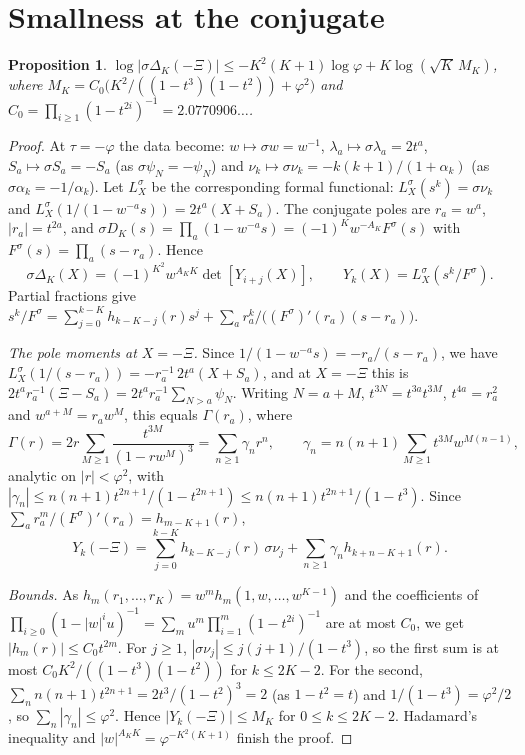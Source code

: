 \documentclass[11pt]{amsart}
\newtheorem{proposition}[theorem]{Proposition}
\theoremstyle{definition}
\theoremstyle{remark}
\numberwithin{equation}{section}
\begin{document}
\section{Smallness at the conjugate}\label{sec:conj}

\begin{proposition}\label{prop:conj}
$\log|\sigma\Delta_K(-\Xi)|\le-K^2(K+1)\log\varphi+K\log(\sqrt K\,M_K)$, where
$M_K=C_0\bigl(K^2/((1-t^3)(1-t^2))+\varphi^2\bigr)$ and $C_0=\prod_{i\ge1}(1-t^{2i})^{-1}=2.0770906\ldots$.
\end{proposition}
\begin{proof}
At $\tau=-\varphi$ the data become: $w\mapsto\sigma w=w^{-1}$, $\lambda_a\mapsto\sigma\lambda_a=2t^a$,
$S_a\mapsto\sigma S_a=-S_a$ (as $\sigma\psi_N=-\psi_N$) and $\nu_k\mapsto\sigma\nu_k=-k(k+1)/(1+\alpha_k)$ (as
$\sigma\alpha_k=-1/\alpha_k$). Let $L^\sigma_X$ be the corresponding formal functional:
$L^\sigma_X(s^k)=\sigma\nu_k$ and $L^\sigma_X(1/(1-w^{-a}s))=2t^a(X+S_a)$. The conjugate poles are $r_a=w^a$,
$|r_a|=t^{2a}$, and $\sigma D_K(s)=\prod_a(1-w^{-a}s)=(-1)^Kw^{-A_K}F^\sigma(s)$ with $F^\sigma(s)=\prod_a(s-r_a)$. Hence
\[
\sigma\Delta_K(X)=(-1)^{K^2}w^{A_KK}\det[Y_{i+j}(X)],\qquad Y_k(X)=L^\sigma_X(s^k/F^\sigma).
\]
Partial fractions give
$s^k/F^\sigma=\sum_{j=0}^{k-K}h_{k-K-j}(r)s^j+\sum_ar_a^k/\bigl((F^\sigma)'(r_a)(s-r_a)\bigr)$.

\emph{The pole moments at $X=-\Xi$.} Since $1/(1-w^{-a}s)=-r_a/(s-r_a)$, we have
$L^\sigma_X(1/(s-r_a))=-r_a^{-1}\,2t^a(X+S_a)$, and at $X=-\Xi$ this is
$2t^ar_a^{-1}(\Xi-S_a)=2t^ar_a^{-1}\sum_{N>a}\psi_N$. Writing $N=a+M$, $t^{3N}=t^{3a}t^{3M}$, $t^{4a}=r_a^2$ and
$w^{a+M}=r_aw^M$, this equals $\Gamma(r_a)$, where
\[
\Gamma(r)=2r\sum_{M\ge1}\frac{t^{3M}}{(1-rw^M)^3}=\sum_{n\ge1}\gamma_nr^n,\qquad
\gamma_n=n(n+1)\sum_{M\ge1}t^{3M}w^{M(n-1)},
\]
analytic on $|r|<\varphi^2$, with $|\gamma_n|\le n(n+1)t^{2n+1}/(1-t^{2n+1})\le n(n+1)t^{2n+1}/(1-t^3)$. Since
$\sum_ar_a^m/(F^\sigma)'(r_a)=h_{m-K+1}(r)$,
\[
Y_k(-\Xi)=\sum_{j=0}^{k-K}h_{k-K-j}(r)\,\sigma\nu_j+\sum_{n\ge1}\gamma_nh_{k+n-K+1}(r).
\]

\emph{Bounds.} As $h_m(r_1,\dots,r_K)=w^mh_m(1,w,\dots,w^{K-1})$ and the coefficients of
$\prod_{i\ge0}(1-|w|^iu)^{-1}=\sum_m u^m\prod_{i=1}^m(1-t^{2i})^{-1}$ are at most $C_0$, we get $|h_m(r)|\le C_0t^{2m}$.
For $j\ge1$, $|\sigma\nu_j|\le j(j+1)/(1-t^3)$, so the first sum is at most $C_0K^2/((1-t^3)(1-t^2))$ for $k\le2K-2$.
For the second, $\sum_nn(n+1)t^{2n+1}=2t^3/(1-t^2)^3=2$ (as $1-t^2=t$) and $1/(1-t^3)=\varphi^2/2$, so
$\sum_n|\gamma_n|\le\varphi^2$. Hence $|Y_k(-\Xi)|\le M_K$ for $0\le k\le2K-2$. Hadamard's inequality and
$|w|^{A_KK}=\varphi^{-K^2(K+1)}$ finish the proof.
\end{proof}
\end{document}
